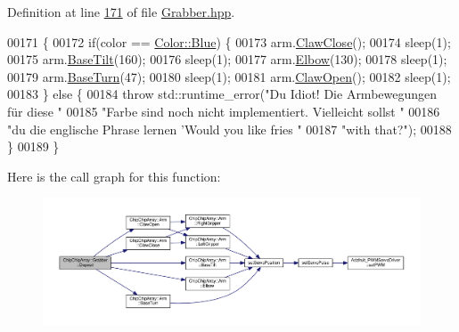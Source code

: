 Definition at line \hyperlink{Grabber_8hpp_source_l00171}{171} of file \hyperlink{Grabber_8hpp_source}{Grabber.\+hpp}.


\begin{DoxyCode}
00171                                      \{
00172         \textcolor{keywordflow}{if}(color == \hyperlink{definitions_8hpp_abc05a0f46084a3477cf5d5c939ff1436a9594eec95be70e7b1710f730fdda33d9}{Color::Blue}) \{
00173             arm.\hyperlink{classChipChipArray_1_1Arm_a20c6fe3fe79c16f492a8c18b91427080}{ClawClose}();
00174             sleep(1);
00175             arm.\hyperlink{classChipChipArray_1_1Arm_a8b077a3791d9fc5ef285c1520fe4c5d8}{BaseTilt}(160);
00176             sleep(1);
00177             arm.\hyperlink{classChipChipArray_1_1Arm_ac45149e03abfac230b75156bb42e8417}{Elbow}(130);
00178             sleep(1);
00179             arm.\hyperlink{classChipChipArray_1_1Arm_addaedfe85ff2b14ff00c344fc4b40cd6}{BaseTurn}(47);
00180             sleep(1);
00181             arm.\hyperlink{classChipChipArray_1_1Arm_abb33b5bb11034554d632f8c9b95b2c44}{ClawOpen}();
00182             sleep(1);
00183         \} \textcolor{keywordflow}{else} \{
00184             \textcolor{keywordflow}{throw} std::runtime\_error(\textcolor{stringliteral}{"Du Idiot! Die Armbewegungen für diese "}
00185                     \textcolor{stringliteral}{"Farbe sind noch nicht implementiert. Vielleicht sollst "}
00186                     \textcolor{stringliteral}{"du die englische Phrase lernen 'Would you like fries "}
00187                     \textcolor{stringliteral}{"with that?"});
00188         \}
00189     \}
\end{DoxyCode}


Here is the call graph for this function\+:
\nopagebreak
\begin{figure}[H]
\begin{center}
\leavevmode
\includegraphics[width=350pt]{classChipChipArray_1_1Grabber_a44e5aeb908634f68de356ad8df3c4bf1_cgraph}
\end{center}
\end{figure}




